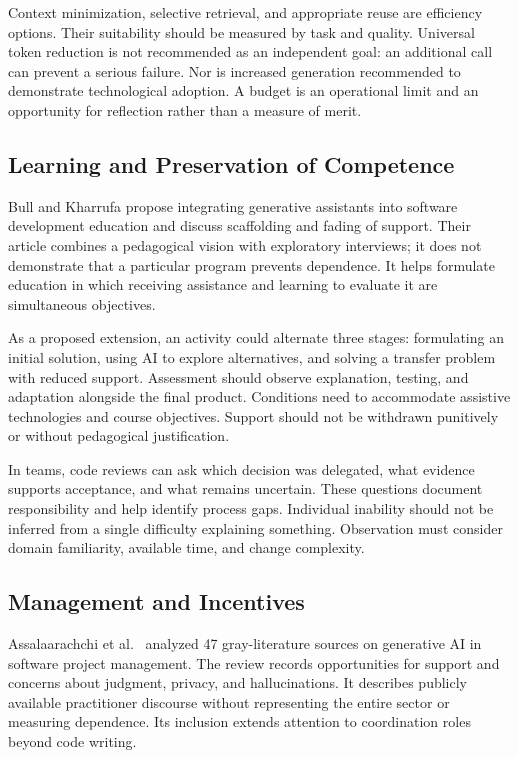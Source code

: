 \documentclass[11pt,a4paper]{article}
\begin{document}
Context minimization, selective retrieval, and appropriate reuse are efficiency options. Their suitability should be measured by task and quality. Universal token reduction is not recommended as an independent goal: an additional call can prevent a serious failure. Nor is increased generation recommended to demonstrate technological adoption. A budget is an operational limit and an opportunity for reflection rather than a measure of merit.

\subsection{Learning and Preservation of Competence}
Bull and Kharrufa \cite{educacao} propose integrating generative assistants into software development education and discuss scaffolding and fading of support. Their article combines a pedagogical vision with exploratory interviews; it does not demonstrate that a particular program prevents dependence. It helps formulate education in which receiving assistance and learning to evaluate it are simultaneous objectives.

As a proposed extension, an activity could alternate three stages: formulating an initial solution, using AI to explore alternatives, and solving a transfer problem with reduced support. Assessment should observe explanation, testing, and adaptation alongside the final product. Conditions need to accommodate assistive technologies and course objectives. Support should not be withdrawn punitively or without pedagogical justification.

In teams, code reviews can ask which decision was delegated, what evidence supports acceptance, and what remains uncertain. These questions document responsibility and help identify process gaps. Individual inability should not be inferred from a single difficulty explaining something. Observation must consider domain familiarity, available time, and change complexity.

\subsection{Management and Incentives}
Assalaarachchi et al.\ \cite{gestao} analyzed 47 gray-literature sources on generative AI in software project management. The review records opportunities for support and concerns about judgment, privacy, and hallucinations. It describes publicly available practitioner discourse without representing the entire sector or measuring dependence. Its inclusion extends attention to coordination roles beyond code writing.
\end{document}
